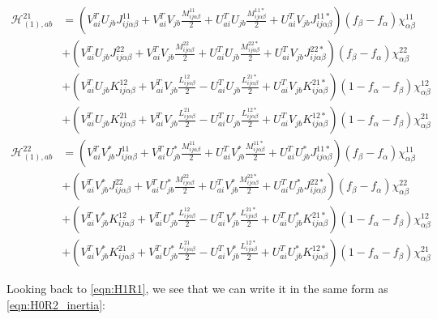 \begin{align*}
\mathcal{H}_{(1),ab}^{21} &= \left(V^T_{ai} U_{jb} J_{ij\alpha\beta}^{11} + V_{ai}^T V_{jb} \frac{M_{ij\alpha\beta}^{11}}{2} + U_{ai}^T U_{jb} \frac{M_{ij\alpha\beta}^{11*}}{2} + U_{ai}^T V_{jb} J_{ij\alpha\beta}^{11*}  \right)(f_\beta-f_\alpha)\chi^{11}_{\alpha\beta} \\
&+ \left(V_{ai}^T U_{jb} J_{ij\alpha\beta}^{22} + V_{ai}^T V_{jb} \frac{M_{ij\alpha\beta}^{22}}{2} + U_{ai}^T U_{jb} \frac{M_{ij\alpha\beta}^{22*}}{2} + U_{ai}^T V_{jb} J_{ij\alpha\beta}^{22*}  \right)(f_\beta-f_\alpha)\chi^{22}_{\alpha\beta} \\
&+ \left(V_{ai}^T U_{jb} K_{ij\alpha\beta}^{12} + V_{ai}^T V_{jb} \frac{L_{ij\alpha\beta}^{12}}{2} - U_{ai}^T U_{jb} \frac{L_{ij\alpha\beta}^{21*}}{2} + U_{ai}^T V_{jb} K_{ij\alpha\beta}^{21*}  \right)\left(1-f_\alpha-f_\beta\right)\chi^{12}_{\alpha\beta} \\
&+ \left(V_{ai}^T U_{jb} K_{ij\alpha\beta}^{21} + V_{ai}^T V_{jb} \frac{L_{ij\alpha\beta}^{21}}{2} - U_{ai}^T U_{jb} \frac{L_{ij\alpha\beta}^{12*}}{2} + U_{ai}^T V_{jb} K_{ij\alpha\beta}^{12*}  \right)\left(1-f_\alpha-f_\beta\right)\chi^{21}_{\alpha\beta}
\end{align*}
\begin{align*}
\mathcal{H}_{(1),ab}^{22} &= \left(V_{ai}^T V^*_{jb} J_{ij\alpha\beta}^{11} + V_{ai}^T U^*_{jb} \frac{M_{ij\alpha\beta}^{11}}{2} + U_{ai}^T V^*_{jb} \frac{M_{ij\alpha\beta}^{11*}}{2} + U_{ai}^T U^*_{jb} J_{ij\alpha\beta}^{11*}  \right)(f_\beta-f_\alpha)\chi^{11}_{\alpha\beta} \\
&+ \left(V_{ai}^T V^*_{jb} J_{ij\alpha\beta}^{22} + V_{ai}^T U^*_{jb} \frac{M_{ij\alpha\beta}^{22}}{2} + U_{ai}^T V^*_{jb} \frac{M_{ij\alpha\beta}^{22*}}{2} + U_{ai}^T U^*_{jb} J_{ij\alpha\beta}^{22*}  \right)(f_\beta-f_\alpha)\chi^{22}_{\alpha\beta} \\
&+ \left(V_{ai}^T V^*_{jb} K_{ij\alpha\beta}^{12} + V_{ai}^T U^*_{jb} \frac{L_{ij\alpha\beta}^{12}}{2} - U_{ai}^T V^*_{jb} \frac{L_{ij\alpha\beta}^{21*}}{2} + U_{ai}^T U^*_{jb} K_{ij\alpha\beta}^{21*}  \right)\left(1-f_\alpha-f_\beta\right)\chi^{12}_{\alpha\beta} \\
&+ \left(V_{ai}^T V^*_{jb} K_{ij\alpha\beta}^{21} + V_{ai}^T U^*_{jb} \frac{L_{ij\alpha\beta}^{21}}{2} - U_{ai}^T V^*_{jb} \frac{L_{ij\alpha\beta}^{12*}}{2} + U_{ai}^T U^*_{jb} K_{ij\alpha\beta}^{12*}  \right)\left(1-f_\alpha-f_\beta\right)\chi^{21}_{\alpha\beta}
\end{align*}

Looking back to \ref{eqn:H1R1}, we see that we can write it in the same form as \ref{eqn:H0R2_inertia}:

